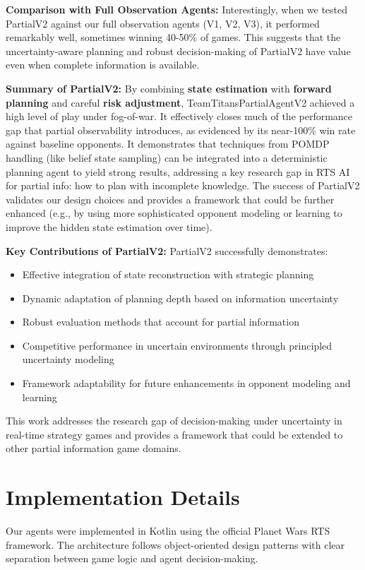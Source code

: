 \documentclass[conference]{IEEEtran}
\begin{document}
\textbf{Comparison with Full Observation Agents:} Interestingly, when we tested PartialV2 against our full observation agents (V1, V2, V3), it performed remarkably well, sometimes winning 40-50\% of games. This suggests that the uncertainty-aware planning and robust decision-making of PartialV2 have value even when complete information is available.

\textbf{Summary of PartialV2:} By combining \textbf{state estimation} with \textbf{forward planning} and careful \textbf{risk adjustment}, TeamTitansPartialAgentV2 achieved a high level of play under fog-of-war. It effectively closes much of the performance gap that partial observability introduces, as evidenced by its near-100\% win rate against baseline opponents. It demonstrates that techniques from POMDP handling (like belief state sampling) can be integrated into a deterministic planning agent to yield strong results, addressing a key research gap in RTS AI for partial info: how to plan with incomplete knowledge. The success of PartialV2 validates our design choices and provides a framework that could be further enhanced (e.g., by using more sophisticated opponent modeling or learning to improve the hidden state estimation over time).

\textbf{Key Contributions of PartialV2:} PartialV2 successfully demonstrates:
\begin{itemize}
\item Effective integration of state reconstruction with strategic planning
\item Dynamic adaptation of planning depth based on information uncertainty
\item Robust evaluation methods that account for partial information
\item Competitive performance in uncertain environments through principled uncertainty modeling
\item Framework adaptability for future enhancements in opponent modeling and learning
\end{itemize}

This work addresses the research gap of decision-making under uncertainty in real-time strategy games and provides a framework that could be extended to other partial information game domains.

\section{Implementation Details}

Our agents were implemented in Kotlin using the official Planet Wars RTS framework. The architecture follows object-oriented design patterns with clear separation between game logic and agent decision-making.
\end{document}
